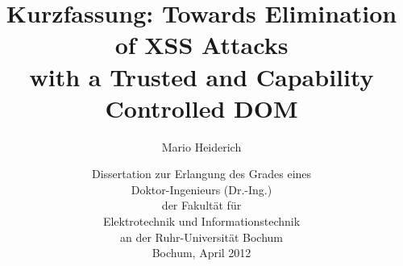 \documentclass{llncs}
\begin{document}
\title{Kurzfassung: Towards Elimination of XSS Attacks\\with a Trusted and Capability Controlled DOM}
\author{Mario Heiderich}
\date{
  {\Large\sc Dissertation zur Erlangung des Grades eines\\}
  {\Large Doktor-Ingenieurs (Dr.-Ing.)}\\
  {\Large der Fakultät für\\
    Elektrotechnik und Informationstechnik\\
    an der Ruhr-Universität Bochum}\\
  {\small Bochum, April 2012}
}
\maketitle

\end{document}
